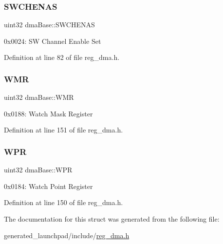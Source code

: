 \subsubsection{\texorpdfstring{S\+W\+C\+H\+E\+N\+AS}{SWCHENAS}}
{\footnotesize\ttfamily uint32 dma\+Base\+::\+S\+W\+C\+H\+E\+N\+AS}

0x0024\+: SW Channel Enable Set 

Definition at line 82 of file reg\+\_\+dma.\+h.

\mbox{\label{structdmaBase_a5f8c7cfdf49c28abc840fa9f93a82462}} 
\subsubsection{\texorpdfstring{W\+MR}{WMR}}
{\footnotesize\ttfamily uint32 dma\+Base\+::\+W\+MR}

0x0188\+: Watch Mask Register 

Definition at line 151 of file reg\+\_\+dma.\+h.

\mbox{\label{structdmaBase_a6794590df81c6e66215eefbf20bac984}} 
\subsubsection{\texorpdfstring{W\+PR}{WPR}}
{\footnotesize\ttfamily uint32 dma\+Base\+::\+W\+PR}

0x0184\+: Watch Point Register 

Definition at line 150 of file reg\+\_\+dma.\+h.



The documentation for this struct was generated from the following file\+:\begin{DoxyCompactItemize}
\item 
generated\+\_\+launchpad/include/\mbox{\hyperlink{reg__dma_8h}{reg\+\_\+dma.\+h}}\end{DoxyCompactItemize}
